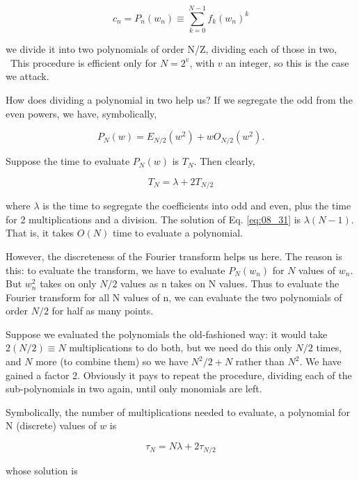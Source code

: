 \begin{equation*}
c_{n} = P_{n}(w_{n}) \equiv \sum_{k=0}^{N-1}f_{k}(w_{n})^k
\end{equation*}

we divide it into two polynomials of order N/Z, dividing each of those in two, \etc\ This procedure is efficient only for $N=2^v$, with $v$ an integer, so this is the case we attack.

How does dividing a polynomial in two help us? If we segregate the odd from the even powers, we have, symbolically,

\begin{equation}\label{eq:08_30}
P_{N}(w) = E_{N/2}(w^{2}) + w O_{N/2}(w^2).
\end{equation}

Suppose the time to evaluate $P_N(w)$ is $T_{N}$. Then clearly,

\begin{equation}\label{eq:08_31}
T_{N} = \lambda + 2T_{N/2}
\end{equation}

where $\lambda$ is the time to segregate the coefficients into odd and even, plus the time for 2 multiplications and a division. The solution of Eq. \ref{eq:08_31} is $\lambda(N-1)$. That is, it takes $O(N)$ time to evaluate a polynomial.

However, the discreteness of the Fourier transform helps us here. The reason is this: to evaluate the transform, we have to evaluate $P_{N}(w_{n})$ for $N$ values of $w_{n}$. But $w_{n}^{2}$ takes on only $N/2$ values as n takes on N values. Thus to evaluate the Fourier transform for all N values of n, we can evaluate the two polynomials of order $N/2$ for half as many points.

Suppose we evaluated the polynomials the old-fashioned way: it would take $2(N/2)\equiv N$ multiplications to do both, but we need do this only $N/2$ times, and $N$ more (to combine them) so we have $N^{2}/2+N$ rather than $N^{2}$. We have gained a factor 2. Obviously it pays to repeat the procedure, dividing each of the sub-polynomials in two again, until only monomials are left.

Symbolically, the number of multiplications needed to evaluate, a polynomial for N (discrete) values of $w$ is

\begin{equation}
\tau_{N} = N\lambda + 2\tau_{N/2}
\end{equation}

whose solution is

